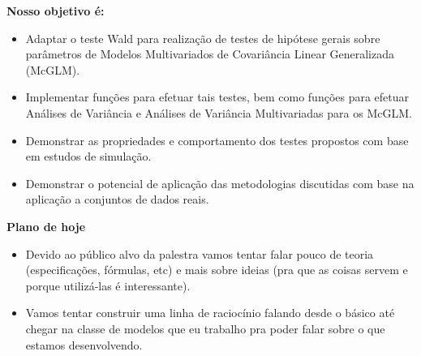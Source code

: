\documentclass[10pt,
  aspectratio=169,
  serif,
  mathserif,
  professionalfont,
  compress,
  handout,
  ]{beamer}\usepackage[]{graphicx}\usepackage[]{color}
\begin{document}
\begin{frame}[c, allowframebreaks]
  
  \textbf{Nosso objetivo é:}
  
  \begin{itemize}
    \item Adaptar o teste Wald para realização de testes de hipótese gerais sobre parâmetros de Modelos Multivariados de Covariância Linear Generalizada (McGLM).
    
    \item Implementar funções para efetuar tais testes, bem como funções para efetuar Análises de Variância e Análises de Variância Multivariadas para os McGLM.
    
    \item Demonstrar as propriedades e comportamento dos testes propostos com base em estudos de simulação.
    
    \item Demonstrar o potencial de aplicação das metodologias discutidas com base na aplicação a conjuntos de dados reais.
    
  \end{itemize}

\end{frame}



\begin{frame}[c, allowframebreaks]
  
  \textbf{Plano de hoje}
  
  \begin{itemize}

  \item Devido ao público alvo da palestra vamos tentar falar pouco de teoria (especificações, fórmulas, etc) e mais sobre ideias (pra que as coisas servem e porque utilizá-las é interessante).
  
  \item Vamos tentar construir uma linha de raciocínio falando desde o básico até chegar na classe de modelos que eu trabalho pra poder falar sobre o que estamos desenvolvendo.
  
  \end{itemize}

\end{frame}
\end{document}
